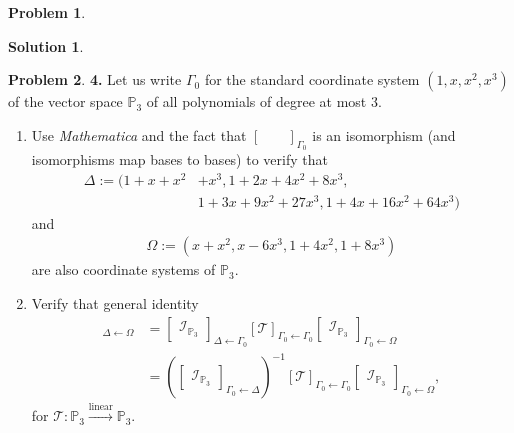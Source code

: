 \documentclass{article}
\theoremstyle{definition}
\newtheorem*{prob*}{Problem}
\newtheorem*{sln*}{Solution}
\begin{document}
\begin{prob*}
\begin{sln*}
\begin{enumerate}
\begin{enumerate}
			\end{enumerate}
			
		\end{enumerate}
	\end{sln*}




\end{prob*}

\newpage














\begin{prob*}\textbf{4.} Let us write $\Gamma_0$ for the standard coordinate system $(1,x,x^2,x^3)$ of the vector space $\mathbb{P}_3$ of all polynomials of degree at most 3. 
	\begin{enumerate}
		\item Use \textit{Mathematica} and the fact that $\begin{bmatrix}\,&\,\end{bmatrix}_{\Gamma_0}$ is an isomorphism (and isomorphisms map bases to bases) to verify that 
		\begin{align*}
		\Delta := (1 + x + x^2 &+ x^3, 1 + 2x+4x^2 + 8x^3,\\
		&1 + 3x+9x^2 + 27x^3, 1+ 4x +16x^2 + 64x^3)
		\end{align*}
		and 
		\begin{align*}
		\Omega := (x+x^2, x-6x^3, 1 + 4x^2, 1+ 8x^3) 
		\end{align*}
		are also coordinate systems of $\mathbb{P}_3$.
	


	\item Verify that general identity
	\begin{align*}
	[\mathcal{T}]_{\Delta \leftarrow \Omega} &= 
	\begin{bmatrix}
	\mathcal{I}_{\mathbb{P}_3}
	\end{bmatrix}_{\Delta \leftarrow \Gamma_0} [\mathcal{T}]_{\Gamma_0 \leftarrow \Gamma_0} 
	\begin{bmatrix}
	\mathcal{I}_{\mathbb{P}_3}
	\end{bmatrix}_{\Gamma_0 \leftarrow \Omega}\\
	&= \left(\begin{bmatrix}
	\mathcal{I}_{\mathbb{P}_3}
	\end{bmatrix}_{\Gamma_0 \leftarrow \Delta}\right)^{-1} [\mathcal{T}]_{\Gamma_0 \leftarrow \Gamma_0} 
	\begin{bmatrix}
	\mathcal{I}_{\mathbb{P}_3}
	\end{bmatrix}_{\Gamma_0 \leftarrow \Omega},
	\end{align*}
	for $\mathcal{T} : \mathbb{P}_3 \overset{\text{linear}}{\longrightarrow} \mathbb{P}_3$.
	

\end{enumerate}
\end{prob*}
\end{document}
